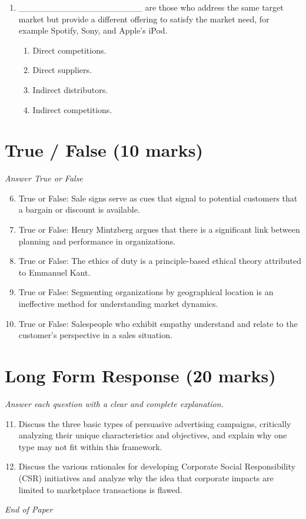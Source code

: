 \documentclass[12pt]{article}
\begin{document}
\begin{enumerate}[label=\arabic*.]
\begin{enumerate}[label=(\alph*)]
\end{enumerate}
\item \_\_\_\_\_\_\_\_\_\_\_\_\_\_\_\_\_\_\_\_ are those who address the same target market but provide a different offering to satisfy the market need, for example Spotify, Sony, and Apple's iPod.
\begin{enumerate}[label=(\alph*)]
    \item Direct competitions.
    \item Direct suppliers.
    \item Indirect distributors.
    \item Indirect competitions.
\end{enumerate}
\end{enumerate}

\section*{True / False (10 marks)}
\textit{Answer True or False}
\begin{enumerate}[label=\arabic*.]
\setcounter{enumi}{5}
\item True or False: Sale signs serve as cues that signal to potential customers that a bargain or discount is available.
\item True or False: Henry Mintzberg argues that there is a significant link between planning and performance in organizations.
\item True or False: The ethics of duty is a principle-based ethical theory attributed to Emmanuel Kant.
\item True or False: Segmenting organizations by geographical location is an ineffective method for understanding market dynamics.
\item True or False: Salespeople who exhibit empathy understand and relate to the customer's perspective in a sales situation.
\end{enumerate}

\section*{Long Form Response (20 marks)}
\textit{Answer each question with a clear and complete explanation.}
\begin{enumerate}[label=\arabic*.]
\setcounter{enumi}{10}
\item Discuss the three basic types of persuasive advertising campaigns, critically analyzing their unique characteristics and objectives, and explain why one type may not fit within this framework.
\item Discuss the various rationales for developing Corporate Social Responsibility (CSR) initiatives and analyze why the idea that corporate impacts are limited to marketplace transactions is flawed.
\end{enumerate}

\vfill
\noindent\textit{End of Paper}
\end{document}

